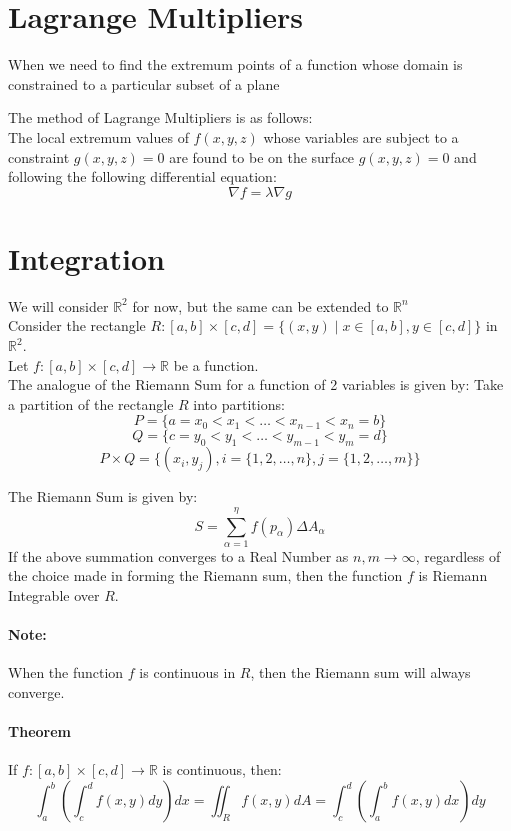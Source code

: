 \documentclass{article}
\begin{document}
\section{Lagrange Multipliers}
When we need to find the extremum points of a function whose domain is constrained to a particular subset of a plane

The method of Lagrange Multipliers is as follows:\\
The local extremum values of $f(x,y,z)$ whose variables are subject to a constraint $g(x,y,z) = 0$ are found to be on the surface $g(x,y,z) = 0$ and following the following differential equation:
\[ \nabla f = \lambda \nabla g \]

\section{Integration}
We will consider $\mathbb{R}^2$ for now, but the same can be extended to $\mathbb{R}^n$\\
Consider the rectangle $R: [a,b] \times [c,d] = \{(x,y) \mid x \in [a,b], y \in [c,d]\}$ in $\mathbb{R}^2$.\\
Let $f: [a,b] \times [c,d] \rightarrow \mathbb{R}$ be a function.\\
The analogue of the Riemann Sum for a function of 2 variables is given by:
Take a partition of the rectangle $R$ into partitions:
\[ P = \{ a = x_0 < x_1 < \dots < x_{n-1} < x_n = b\} \]
\[ Q = \{ c = y_0 < y_1 < \dots < y_{m-1} < y_m = d\} \]
\[ P \times Q = \{ (x_i, y_j), i = \{1, 2, \dots, n \}, j = \{ 1, 2, \dots, m \} \}\]

The Riemann Sum is given by:
\[ S = \sum_{\alpha = 1}^{\eta} f(p_{\alpha}) \Delta A_{\alpha} \]
If the above summation converges to a Real Number as $n, m \rightarrow \infty$, regardless of the choice made in forming the Riemann sum, then the function $f$ is Riemann Integrable over $R$.

\paragraph{Note:} When the function $f$ is continuous in $R$, then the Riemann sum will always converge.

\paragraph{Theorem} If $f: [a,b] \times [c,d] \rightarrow \mathbb{R}$ is continuous, then: 
\[ \int_{a}^{b} \left( \int_{c}^{d} f(x,y) dy \right) dx = \iint_R f(x,y) dA = \int_{c}^{d} \left( \int_{a}^{b} f(x,y) dx \right) dy \]
\end{document}
